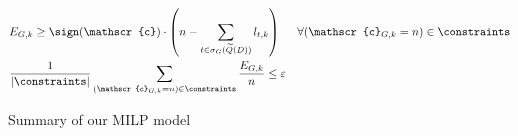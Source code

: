 \begin{figure}
\begin{align*}
        & E_{G, k} \geq \sign(\mathscr{c}) \cdot \left (n - \sum_{t \in \sigma_G(\widetilde{Q}(D))} l_{t, k} \right ) && \forall (\mathscr{c}_{G, k} = n) \in \constraints \\
        & \frac{1}{|\constraints|} \sum_{(\mathscr{c}_{G, k} = n) \in \constraints} \frac{E_{G, k}}{n} \leq \varepsilon 
    \end{align*}
    \caption{Summary of our MILP model}
    \label{fig:milp}
\end{figure}

